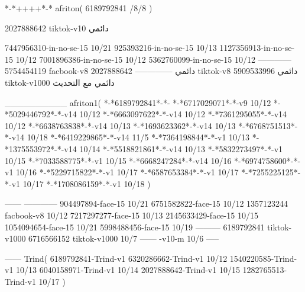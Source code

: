 *-*++++*-*
afriton(
6189792841 /8/8
)

2027888642 tiktok-v10
دائمي


7447956310-in-no-se-15 10/21
925393216-in-no-se-15 10/13
1127356913-in-no-se-15 10/12
7001896386-in-no-se-15 10/12
5362760099-in-no-se-15 10/12
------------
5754454119 facbook-v8
دائمي
--------------
2027888642 tiktok-v8
دائمي
5909533996 tiktok-v1000
دائمي مع التحديث

__________
afriton1(
*-*6189792841*-*-
*-*6717029071*-*-v9 10/12
*-*5029446792*-*-v14 10/12
*-*6663097622*-*-v14 10/12
*-*7361295055*-*-v14 10/12
*-*6638763838*-*-v14 10/13
*-*1693623362*-*-v14 10/13
*-*6768751513*-*-v14 10/18
*-*6419229865*-*-v14 11/5
*-*7364198844*-*-v1 10/13
*-*1375553972*-*-v14 10/14
*-*5518821861*-*-v14 10/13
*-*5832273497*-*-v1 10/15
*-*7033588775*-*-v1 10/15
*-*6668247284*-*-v14 10/16
*-*6974758600*-*-v1 10/16
*-*5229715822*-*-v1 10/17
*-*6587653384*-*-v1 10/17
*-*7255225125*-*-v1 10/17
*-*1708086159*-*-v1 10/18
)

------
------------
904497894-face-15 10/21
6751582822-face-15 10/12
1357123244 facbook-v8 10/12
7217297277-face-15 10/13
2145633429-face-15 10/15
1054094654-face-15 10/21
5998488456-face-15 10/19
---------
6189792841 tiktok-v1000
6716566152 tiktok-v1000
10/7
------
-v10-m 10/6
-----

------
Trind(
6189792841-Trind-v1 
6320286662-Trind-v1 10/12
1540220585-Trind-v1 10/13
6040158971-Trind-v1 10/14
2027888642-Trind-v1 10/15
1282765513-Trind-v1 10/17
)
